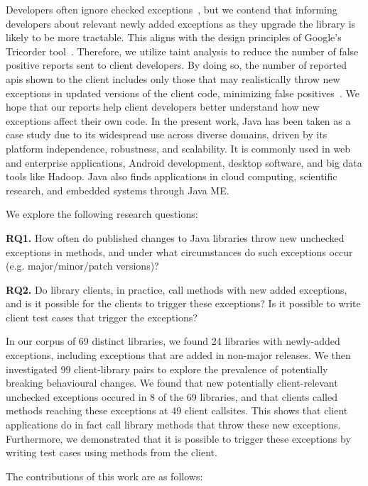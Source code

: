 Developers often ignore checked exceptions~\cite{nakshatri16:_analy_java}, but we contend that informing developers about relevant newly added exceptions as they upgrade the library is likely to be more tractable. This aligns with the design principles of Google’s Tricorder tool~\cite{sadowski15:_tricor}. Therefore, we utilize taint analysis to reduce the number of false positive reports sent to client developers. By doing so, the number of reported \gls{api}s shown to the client includes only those that may realistically throw new exceptions in updated versions of the client code, minimizing false positives~\cite{pashchenko20:_vuln4,pashchenko18:_vulner}. We hope that our reports help client developers better understand how new exceptions affect their own code. In the present work, Java has been taken as a case study due to its widespread
use across diverse domains, driven by its platform independence, robustness, and scalability. It is commonly used in web and enterprise applications, Android development,
desktop software, and big data tools like Hadoop. Java also finds applications in cloud
computing, scientific research, and embedded systems through Java ME.


\newpage
We explore the following research questions:

\noindent
{\bf RQ1.} How often do published changes to Java libraries throw new unchecked exceptions in methods,
and under what circumstances do such exceptions occur (e.g. major/minor/patch versions)?

\noindent
{\bf RQ2.} Do library clients, in practice, call methods with new added exceptions, and is it possible for the clients to trigger these exceptions? Is it possible to write client test cases that trigger the exceptions?

In our corpus of 69 distinct libraries, we found 24 libraries with newly-added exceptions, including exceptions that are added in non-major releases.
We then investigated 99 client-library pairs to explore the prevalence of potentially breaking behavioural changes.
We found that new potentially client-relevant unchecked exceptions occured in 8 of the 69 libraries, and that clients called methods reaching these exceptions at 49 client callsites.
This shows that client applications do in fact call library methods that throw these new exceptions.
Furthermore, we demonstrated that it is possible to trigger these exceptions by writing test cases using methods from the client.

The contributions of this work are as follows:

